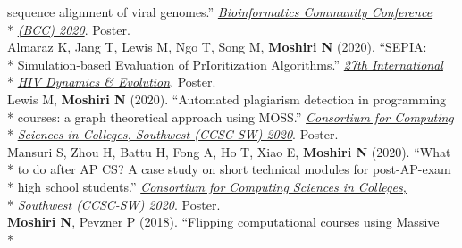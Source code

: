 \documentclass[margin,line]{res}
\begin{document}
\begin{resume}
\hspace*{9mm} sequence alignment of viral genomes.'' \href{https://bcc2020.github.io/}{\textit{Bioinformatics Community Conference}}\\*\vspace{2mm}
\hspace*{8mm} \href{https://bcc2020.github.io/}{\textit{(BCC) 2020}}. Poster.\\
\hspace*{4mm} Almaraz K, Jang T, Lewis M, Ngo T, Song M, \textbf{Moshiri N} (2020). ``SEPIA:\\*
\hspace*{9mm} Simulation-based Evaluation of PrIoritization Algorithms.'' \href{https://cme.ucsd.edu/hivdynamics/}{\textit{27th International}}\\*\vspace{2mm}
\hspace*{8mm} \href{https://cme.ucsd.edu/hivdynamics/}{\textit{HIV Dynamics \& Evolution}}. Poster.\\
\hspace*{4mm} Lewis M, \textbf{Moshiri N} (2020). ``Automated plagiarism detection in programming\\*
\hspace*{9mm} courses: a graph theoretical approach using MOSS.'' \href{http://ccsc.org/southwestern/2020/index.php}{\textit{Consortium for Computing}}\\*\vspace{2mm}
\hspace*{8mm} \href{http://ccsc.org/southwestern/2020/index.php}{\textit{Sciences in Colleges, Southwest (CCSC-SW) 2020}}. Poster.\\
\hspace*{4mm} Mansuri S, Zhou H, Battu H, Fong A, Ho T, Xiao E, \textbf{Moshiri N} (2020). ``What\\*
\hspace*{9mm} to do after AP CS? A case study on short technical modules for post-AP-exam\\*
\hspace*{9mm} high school students.'' \href{http://ccsc.org/southwestern/2020/index.php}{\textit{Consortium for Computing Sciences in Colleges,}}\\*\vspace{2mm}
\hspace*{8mm} \href{http://ccsc.org/southwestern/2020/index.php}{\textit{Southwest (CCSC-SW) 2020}}. Poster.\\
\hspace*{4mm} \textbf{Moshiri N}, Pevzner P (2018). ``Flipping computational courses using Massive\\*

\end{resume}
\end{document}
